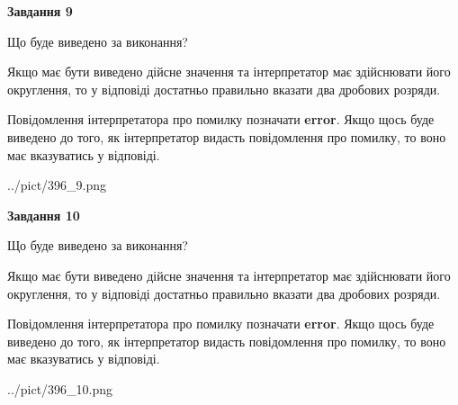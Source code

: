 \documentclass[12pt, ukrainian]{article}
\begin{document}
{\begin {Large}
{\begin {center}\textbf{Завдання 9}\end {center}}\par
Що буде виведено за виконання? \par

Якщо має бути виведено дійсне значення та інтерпретатор має здійснювати його округлення, 
то у відповіді достатньо правильно вказати два дробових розряди.

Повідомлення інтерпретатора про помилку позначати \textbf{error}.
Якщо щось буде виведено до того, як інтерпретатор видасть повідомлення про помилку, 
то воно має вказуватись у відповіді. \par

\begin{center}
	{../pict/396_9.png}
\end{center}
\newpage

{\begin {center}\textbf{Завдання 10}\end {center}}\par
Що буде виведено за виконання? \par

Якщо має бути виведено дійсне значення та інтерпретатор має здійснювати його округлення, 
то у відповіді достатньо правильно вказати два дробових розряди.

Повідомлення інтерпретатора про помилку позначати \textbf{error}.
Якщо щось буде виведено до того, як інтерпретатор видасть повідомлення про помилку, 
то воно має вказуватись у відповіді. \par

\begin{center}
	{../pict/396_10.png}
\end{center}
\newpage

\end {Large}}
\end{document}

